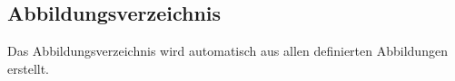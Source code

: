\subsection{Abbildungsverzeichnis}

Das Abbildungsverzeichnis wird automatisch aus allen definierten Abbildungen erstellt.
